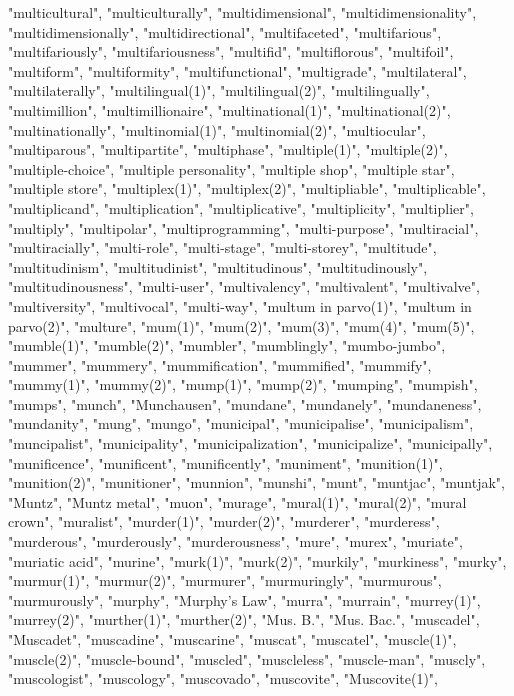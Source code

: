 "multicultural",
"multiculturally",
"multidimensional",
"multidimensionality",
"multidimensionally",
"multidirectional",
"multifaceted",
"multifarious",
"multifariously",
"multifariousness",
"multifid",
"multiflorous",
"multifoil",
"multiform",
"multiformity",
"multifunctional",
"multigrade",
"multilateral",
"multilaterally",
"multilingual(1)",
"multilingual(2)",
"multilingually",
"multimillion",
"multimillionaire",
"multinational(1)",
"multinational(2)",
"multinationally",
"multinomial(1)",
"multinomial(2)",
"multiocular",
"multiparous",
"multipartite",
"multiphase",
"multiple(1)",
"multiple(2)",
"multiple-choice",
"multiple personality",
"multiple shop",
"multiple star",
"multiple store",
"multiplex(1)",
"multiplex(2)",
"multipliable",
"multiplicable",
"multiplicand",
"multiplication",
"multiplicative",
"multiplicity",
"multiplier",
"multiply",
"multipolar",
"multiprogramming",
"multi-purpose",
"multiracial",
"multiracially",
"multi-role",
"multi-stage",
"multi-storey",
"multitude",
"multitudinism",
"multitudinist",
"multitudinous",
"multitudinously",
"multitudinousness",
"multi-user",
"multivalency",
"multivalent",
"multivalve",
"multiversity",
"multivocal",
"multi-way",
"multum in parvo(1)",
"multum in parvo(2)",
"multure",
"mum(1)",
"mum(2)",
"mum(3)",
"mum(4)",
"mum(5)",
"mumble(1)",
"mumble(2)",
"mumbler",
"mumblingly",
"mumbo-jumbo",
"mummer",
"mummery",
"mummification",
"mummified",
"mummify",
"mummy(1)",
"mummy(2)",
"mump(1)",
"mump(2)",
"mumping",
"mumpish",
"mumps",
"munch",
"Munchausen",
"mundane",
"mundanely",
"mundaneness",
"mundanity",
"mung",
"mungo",
"municipal",
"municipalise",
"municipalism",
"muncipalist",
"municipality",
"municipalization",
"municipalize",
"municipally",
"munificence",
"munificent",
"munificently",
"muniment",
"munition(1)",
"munition(2)",
"munitioner",
"munnion",
"munshi",
"munt",
"muntjac",
"muntjak",
"Muntz",
"Muntz metal",
"muon",
"murage",
"mural(1)",
"mural(2)",
"mural crown",
"muralist",
"murder(1)",
"murder(2)",
"murderer",
"murderess",
"murderous",
"murderously",
"murderousness",
"mure",
"murex",
"muriate",
"muriatic acid",
"murine",
"murk(1)",
"murk(2)",
"murkily",
"murkiness",
"murky",
"murmur(1)",
"murmur(2)",
"murmurer",
"murmuringly",
"murmurous",
"murmurously",
"murphy",
"Murphy's Law",
"murra",
"murrain",
"murrey(1)",
"murrey(2)",
"murther(1)",
"murther(2)",
"Mus. B.",
"Mus. Bac.",
"muscadel",
"Muscadet",
"muscadine",
"muscarine",
"muscat",
"muscatel",
"muscle(1)",
"muscle(2)",
"muscle-bound",
"muscled",
"muscleless",
"muscle-man",
"muscly",
"muscologist",
"muscology",
"muscovado",
"muscovite",
"Muscovite(1)",
